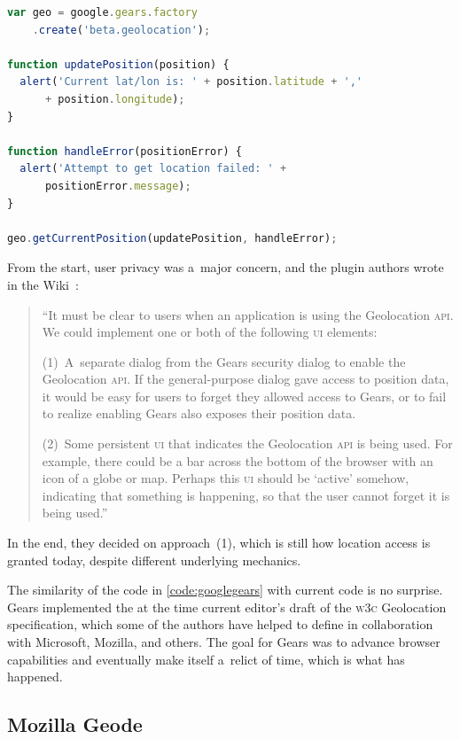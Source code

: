 \documentclass[sigconf,hyphens]{acmart}
\begin{document}
\begin{lstlisting}[caption={Google Gears \textsc{api} (2008)},
  label=code:googlegears, language=JavaScript, float=h] 
var geo = google.gears.factory
    .create('beta.geolocation');

function updatePosition(position) {
  alert('Current lat/lon is: ' + position.latitude + ','
      + position.longitude);
}

function handleError(positionError) {
  alert('Attempt to get location failed: ' +
      positionError.message);
}

geo.getCurrentPosition(updatePosition, handleError);
\end{lstlisting} 

From the start, user privacy was a~major concern, and
the plugin authors wrote in the Wiki~\cite{gears2008wiki}:

\begin{quote}
``It must be clear to users when an application is using the Geolocation \textsc{api}.
We could implement one or both of the following \textsc{ui} elements:

(1)~A~separate dialog from the Gears security dialog to enable the Geolocation \textsc{api}.
If the general-purpose dialog gave access to position data,
it would be easy for users to forget they allowed access to Gears,
or to fail to realize enabling Gears also exposes their position data.

(2)~Some persistent \textsc{ui} that indicates the Geolocation \textsc{api} is being used.
For example, there could be a bar across the bottom of the browser with an icon of a globe or map.
Perhaps this \textsc{ui} should be `active' somehow, indicating that something is happening,
so that the user cannot forget it is being used.''
\end{quote}

In the end, they decided on approach~(1), which is still how location access is granted today,
despite different underlying mechanics.

The similarity of the code in \autoref{code:googlegears} with current code is no surprise.
Gears implemented the at the time current editor's draft of the \textsc{w3c} Geolocation specification,
which some of the authors have helped to define in collaboration with Microsoft, Mozilla, and others.
The goal for Gears was to advance browser capabilities and eventually make itself a~relict of time,
which is what has happened.

\subsection{Mozilla Geode}
\end{document}
